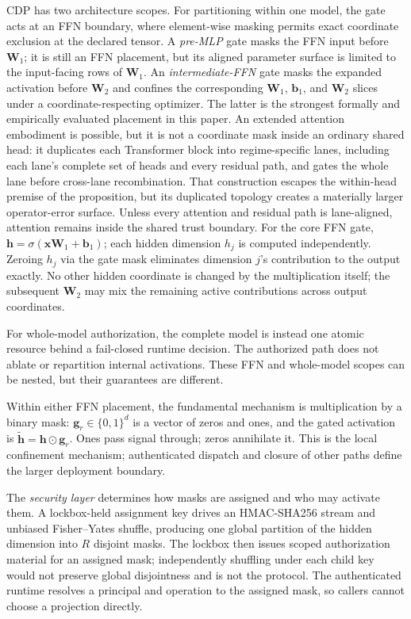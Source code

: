 \documentclass[11pt,a4paper]{article}
\newcommand{\bx}{\mathbf{x}}
\newcommand{\bh}{\mathbf{h}}
\newcommand{\bW}{\mathbf{W}}
\newcommand{\bg}{\mathbf{g}}
\begin{document}
CDP has two architecture scopes.  For partitioning within one model,
the gate acts at an FFN boundary, where element-wise masking permits
exact coordinate exclusion at the declared tensor.  A
\emph{pre-MLP} gate masks the FFN input before $\bW_1$; it is still an
FFN placement, but its aligned parameter surface is limited to the
input-facing rows of $\bW_1$.  An \emph{intermediate-FFN} gate masks
the expanded activation before $\bW_2$ and confines the corresponding
$\bW_1$, $\mathbf b_1$, and $\bW_2$ slices under a
coordinate-respecting optimizer.  The latter is the strongest
formally and empirically evaluated placement in this paper.  An
extended attention embodiment is possible, but it is not a
coordinate mask inside an ordinary shared head: it duplicates each
Transformer block into regime-specific lanes, including each lane's
complete set of heads and every residual path, and gates the whole
lane before cross-lane recombination.  That construction escapes the
within-head premise of the proposition, but its duplicated topology
creates a materially larger operator-error surface.  Unless every
attention and residual path is lane-aligned, attention remains inside
the shared trust boundary.  For the core FFN gate,
$\bh = \sigma(\bx \bW_1 + \mathbf{b}_1)$; each hidden dimension
$h_j$ is computed independently.  Zeroing $h_j$ via the gate mask
eliminates dimension $j$'s contribution to the output exactly.
No other hidden coordinate is changed by the multiplication itself;
the subsequent $\bW_2$ may mix the remaining active contributions
across output coordinates.

For whole-model authorization, the complete model is instead one
atomic resource behind a fail-closed runtime decision.  The authorized
path does not ablate or repartition internal activations.  These FFN
and whole-model scopes can be nested, but their guarantees are
different.

Within either FFN placement, the fundamental mechanism is
multiplication by a binary mask:
$\bg_r \in \{0,1\}^d$ is a vector of zeros and ones, and the
gated activation is $\tilde{\bh} = \bh \odot \bg_r$.  Ones pass
signal through; zeros annihilate it.  This is the local confinement
mechanism; authenticated dispatch and closure of other paths define
the larger deployment boundary.

The \emph{security layer} determines how masks are assigned and who
may activate them.  A lockbox-held assignment key drives an
HMAC-SHA256 stream and unbiased Fisher--Yates shuffle, producing one
global partition of the hidden dimension into $R$ disjoint masks.
The lockbox then issues scoped authorization material for an assigned
mask; independently shuffling under each child key would not preserve
global disjointness and is not the protocol.  The authenticated
runtime resolves a principal and operation to the assigned mask, so
callers cannot choose a projection directly.
\end{document}
